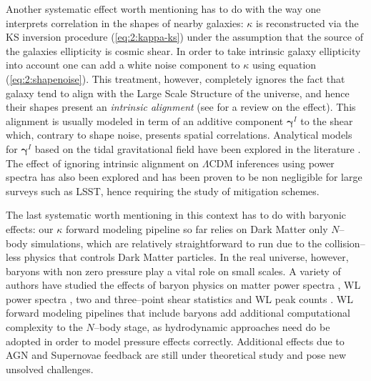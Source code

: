 Another systematic effect worth mentioning has to do with the way one interprets correlation in the shapes of nearby galaxies: $\kappa$ is reconstructed via the KS inversion procedure (\ref{eq:2:kappa-ks}) under the assumption that the source of the galaxies ellipticity is cosmic shear. In order to take intrinsic galaxy ellipticity into account one can add a white noise component to $\kappa$ using equation (\ref{eq:2:shapenoise}). This treatment, however, completely ignores the fact that galaxy tend to align with the Large Scale Structure of the universe, and hence their shapes present an \textit{intrinsic alignment} (see \citep{IAReview} for a review on the effect). This alignment is usually modeled in term of an additive component $\pmb{\gamma}^I$ to the shear which, contrary to shape noise, presents spatial correlations. Analytical models for $\pmb{\gamma}^I$ based on the tidal gravitational field have been explored in the literature \citep{IATidal}. The effect of ignoring intrinsic alignment on $\Lambda$CDM inferences using power spectra has also been explored \citep{IABias} and has been proven to be non negligible for large surveys such as LSST, hence requiring the study of mitigation schemes. 

The last systematic worth mentioning in this context has to do with baryonic effects: our $\kappa$ forward modeling pipeline so far relies on Dark Matter only $N$--body simulations, which are relatively straightforward to run due to the collision--less physics that controls Dark Matter particles. In the real universe, however, baryons with non zero pressure play a vital role on small scales. A variety of authors have studied the effects of baryon physics on matter power spectra \citep{BaryonsZentner1,BaryonsZentner2}, WL power spectra \citep{BaryonsWhite,BaryonsKnox}, two and three--point shear statistics \citep{BaryonSemboloni} and WL peak counts \citep{BaryonXiuyuan}. WL forward modeling pipelines that include baryons add additional computational complexity to the $N$--body stage, as hydrodynamic approaches need do be adopted in order to model pressure effects correctly. Additional effects due to AGN and Supernovae feedback are still under theoretical study and pose new unsolved challenges.      

